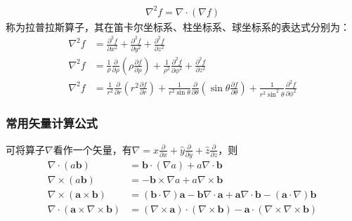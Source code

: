 \documentclass{article}
\numberwithin{equation}{section}
\renewcommand{\vec}[1]{\boldsymbol{#1}}
\begin{document}
\begin{align}
    \nabla^2 f=\nabla \cdot (\nabla f)
\end{align}
称为拉普拉斯算子，其在笛卡尔坐标系、柱坐标系、球坐标系的表达式分别为：
\begin{align}
    \nabla^2 f&=\frac{\partial^2 f}{\partial x^2}+\frac{\partial^2 f}{\partial y^2}+\frac{\partial^2 f}{\partial z^2} \\
    \nabla^2 f&=\frac{1}{\rho}\frac{\partial}{\partial \rho}\left(\rho \frac{\partial f}{\partial \rho}\right)+\frac{1}{\rho^2}\frac{\partial^2 f}{\partial \phi^2}+\frac{\partial^2 f}{\partial z^2} \\
    \nabla^2 f&=\frac{1}{r^2}\frac{\partial}{\partial r}\left(r^2 \frac{\partial f}{\partial r}\right)+\frac{1}{r^2 \sin \theta}\frac{\partial}{\partial \theta}\left(\sin \theta \frac{\partial f}{\partial \theta}\right)+\frac{1}{r^2 \sin ^2 \theta}\frac{\partial ^2 f}{\partial \phi^2}
\end{align}

\subsubsection{常用矢量计算公式}
可将算子$\nabla$看作一个矢量，有$\nabla = \hat{x}\frac{\partial}{\partial x}+\hat{y}\frac{\partial}{\partial y}+\hat{z}\frac{\partial}{\partial z}$，则
\begin{align}
    \nabla \cdot (a\vec{b})&=\vec{b}\cdot (\nabla a)+a\nabla \cdot \vec{b} \\
    \nabla \times (a\vec{b})&=-\vec{b}\times \nabla a+a\nabla \times \vec{b} \\
    \nabla \times (\vec{a}\times \vec{b})&=(\vec{b} \cdot \nabla)\vec{a}-\vec{b}\nabla \cdot \vec{a}+\vec{a}\nabla \cdot \vec{b}-(\vec{a} \cdot \nabla)\vec{b} \\
    \label{eq:eq1}
    \nabla \cdot (\vec{a} \times \nabla \times \vec{b})&=(\nabla \times \vec{a})\cdot (\nabla \times \vec{b})-\vec{a}\cdot (\nabla \times \nabla \times \vec{b})
\end{align}
\end{document}
